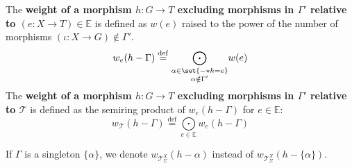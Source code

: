 \begin{definition}
       \noindent
       The \textbf{weight of a morphism \(h : G \to T\) excluding morphisms in \( \Gamma' \) relative to $(e:X \to T) \in \mathbb{E}$} is defined as $w(e)$ raised to the power of the number of morphisms \( (\iota : X \to G) \notin \Gamma' \).
           \[
           w_e(h - \Gamma) \overset{\operatorname{def}}{=} \underset{
               \substack{\alpha \in \set{- \star h = e} \\
                           \alpha \notin \Gamma'}}{\bigodot} w(e)\] 
           The \textbf{weight of a morphism $h: G \to T$ excluding morphisms in \( \Gamma' \) relative to \(\mathcal{T}\)} is defined as the semiring product of $w_e(h-\Gamma)$ for $e \in \mathbb{E}$:
           \[ 
               w_\mathcal{T}(h-\Gamma) \overset{\operatorname{def}}{=} \underset{e \in \mathbb{E}}{\bigodot} 
           w_e(h-\Gamma)
                   \]
   \end{definition} 
       If \( \Gamma \) is a singleton \( \{ \alpha \} \), we denote \( w_{\mathcal{T}_\Sigma^X}(h - \alpha) \) instead of \( w_{\mathcal{T}_\Sigma^X}(h - \{ \alpha \}) \).